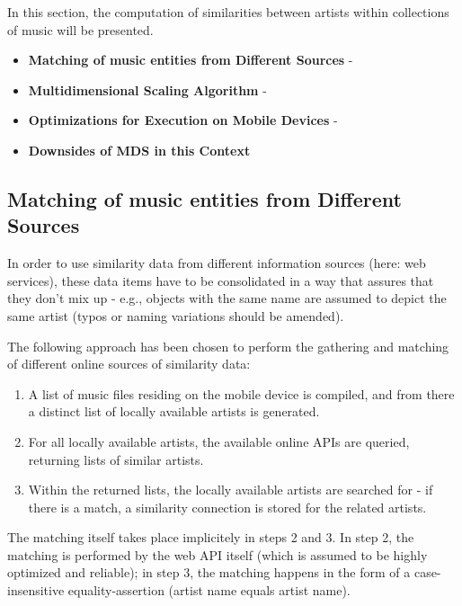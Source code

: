 In this section, the computation of similarities between artists within collections of music
will be presented.

\begin{itemize}
	\item \textbf {Matching of music entities from Different Sources} - 
	\item \textbf {Multidimensional Scaling Algorithm} - 
	\item \textbf {Optimizations for Execution on Mobile Devices} - 
	\item \textbf {Downsides of MDS in this Context}
\end{itemize}

\subsection{Matching of music entities from Different Sources}

In order to use similarity data from different information sources (here: web services), these
data items have to be consolidated in a way that assures that they don't mix up - e.g., objects with
the same name are assumed to depict the same artist (typos or naming variations should be amended).

The following approach has been chosen to perform the gathering and matching of different online sources of 
similarity data:

\begin{enumerate}
	\item A list of music files residing on the mobile device is compiled, and from there a distinct list of 
locally available artists is generated.
	\item For all locally available artists, the available online APIs are queried, returning lists of similar artists.
	\item Within the returned lists, the locally available artists are searched for - if there is a match, a
similarity connection is stored for the related artists.
\end{enumerate}

The matching itself takes place implicitely in steps 2 and 3. In step 2, the matching is performed by the web API
itself (which is assumed to be highly optimized and reliable); in step 3, the matching happens in the form of a
case-insensitive equality-assertion (artist name equals artist name). 

